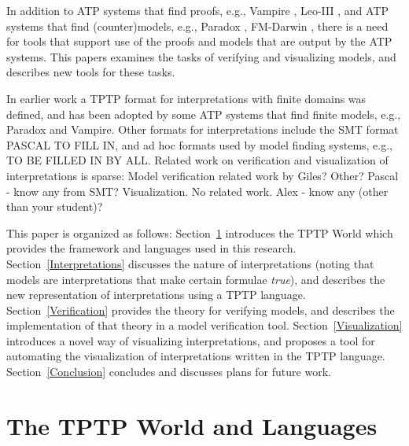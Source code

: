\documentclass[letterpaper]{article}
\begin{document}
In addition to ATP systems that find proofs, e.g., Vampire \cite{KV13}, Leo-III \cite{SB18},
and ATP systems that find (counter)models, e.g., Paradox \cite{CS03}, FM-Darwin \cite{BF+09},
there is a need for tools that support use of the proofs and models that are output by the 
ATP systems.
This papers examines the tasks of verifying and visualizing models, and describes new tools for
these tasks.

In earlier work \cite{SS+06} a TPTP format for interpretations with finite domains was defined,
and has been adopted by some ATP systems that find finite models, e.g., Paradox and Vampire.
Other formats for interpretations include the SMT format PASCAL TO FILL IN, and ad hoc formats
used by model finding systems, e.g., TO BE FILLED IN BY ALL.
Related work on verification and visualization of interpretations is sparse:
Model verification related work by Giles? Other? Pascal - know any from SMT?
Visualization.
No related work. Alex - know any (other than your student)?

This paper is organized as follows:
Section~\ref{TPTP} introduces the TPTP World which provides the framework and languages used
in this research.
Section~\ref{Interpretations} discusses the nature of interpretations (noting that models are
interpretations that make certain formulae {\em true}), and describes the new 
representation of interpretations using a TPTP language.
Section~\ref{Verification} provides the theory for verifying models, and describes the
implementation of that theory in a model verification tool.
Section~\ref{Visualization} introduces a novel way of visualizing interpretations, and
proposes a tool for automating the visualization of interpretations written in the TPTP language.
Section~\ref{Conclusion} concludes and discusses plans for future work.

\section{The TPTP World and Languages}
\label{TPTP}
\end{document}
